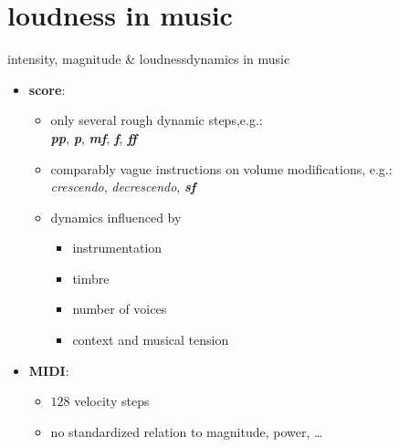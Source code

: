     \section[music]{loudness in music}
        \begin{frame}{intensity, magnitude \& loudness}{dynamics in music}
            \begin{itemize}
                \item	\textbf{score}:
                        \begin{itemize}
                            \item	only several rough dynamic steps,e.g.:\\ \emph{\textbf{pp}}, \emph{\textbf{p}}, \emph{\textbf{mf}}, \emph{\textbf{f}}, \emph{\textbf{ff}}
                            \item<2->	comparably vague instructions on volume modifications, e.g.:\\ \textsl{crescendo}, \textsl{decrescendo}, \emph{\textbf{sf}}
                            \item<3->	dynamics influenced by
                                    \begin{itemize}
                                        \item	instrumentation
                                        \item	timbre
                                        \item	number of voices
                                        \item	context and musical tension
                                    \end{itemize}
                        \end{itemize}
                \smallskip
                \item<4->	\textbf{MIDI}:
                        \begin{itemize}
                            \item	$128$ velocity steps
                            \item	no standardized relation to magnitude, power, \ldots
                        \end{itemize}
            \end{itemize}
        \end{frame}


